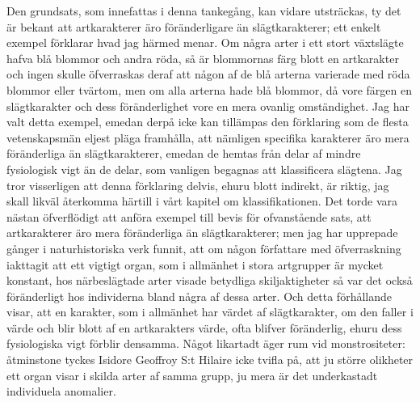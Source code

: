 Den grundsats, som innefattas i denna tankegång, kan vidare utsträckas, ty det är bekant att artkarakterer äro föränderligare än slägtkarakterer; ett enkelt exempel förklarar hvad jag härmed menar. Om några arter i ett stort växtslägte hafva blå blommor och andra röda, så är blommornas färg blott en artkarakter och ingen skulle öfverraskas deraf att någon af de blå arterna varierade med röda blommor eller tvärtom, men om alla arterna hade blå blommor, då vore färgen en slägtkarakter och dess föränderlighet vore en mera ovanlig omständighet. Jag har valt detta exempel, emedan derpå icke kan tillämpas den förklaring som de flesta vetenskapsmän eljest pläga framhålla, att nämligen specifika karakterer äro mera föränderliga än slägtkarakterer, emedan de hemtas från delar af mindre fysiologisk vigt än de delar, som vanligen begagnas att klassificera slägtena. Jag tror visserligen att denna förklaring delvis, ehuru blott indirekt, är riktig, jag skall likväl återkomma härtill i vårt kapitel om klassifikationen. Det torde vara nästan öfverflödigt att anföra exempel till bevis för ofvanstående sats, att artkarakterer äro mera föränderliga än slägtkarakterer; men jag har upprepade gånger i naturhistoriska verk funnit, att om någon författare med öfverraskning iakttagit att ett vigtigt organ, som i allmänhet i stora artgrupper är mycket konstant, hos närbeslägtade arter visade betydliga skiljaktigheter så var det också föränderligt hos individerna bland några af dessa arter. Och detta förhållande visar, att en karakter, som i allmänhet har värdet af slägtkarakter, om den faller i värde och blir blott af en artkarakters värde, ofta blifver föränderlig, ehuru dess fysiologiska vigt förblir densamma. Något likartadt äger rum vid monstrositeter: åtminstone tyckes Isidore Geoffroy S:t Hilaire icke tvifla på, att ju större olikheter ett organ visar i skilda arter af samma grupp, ju mera är det underkastadt individuela anomalier.

